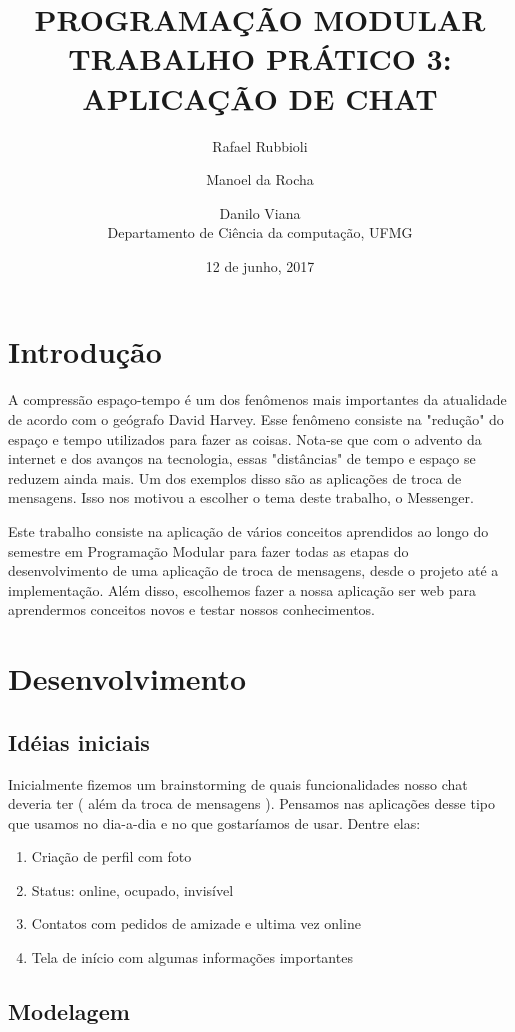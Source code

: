 \documentclass[12pt]{article}
\title{\LARGE \textbf{\uppercase{Programação modular\\Trabalho prático 3: Aplicação de Chat}} }
\date{12 de junho, 2017}
\author{Rafael Rubbioli\\
\and Manoel da Rocha\\
\and Danilo Viana\\ Departamento de Ciência da computação, UFMG}
\begin{document}
	\begin{titlepage}
		\maketitle
	\end{titlepage}
	\section{Introdução}
		
		A compressão espaço-tempo é um dos fenômenos mais importantes da atualidade de acordo com o geógrafo David Harvey. Esse fenômeno consiste na "redução" do espaço e tempo utilizados para fazer as coisas. Nota-se que com o advento da internet e dos avanços na tecnologia, essas "distâncias" de tempo e espaço se reduzem ainda mais. Um dos exemplos disso são as aplicações de troca de mensagens. Isso nos motivou a escolher o tema deste trabalho, o Messenger.

		Este trabalho consiste na aplicação de vários conceitos aprendidos ao longo do semestre em Programação Modular para fazer todas as etapas do desenvolvimento de uma aplicação de troca de mensagens, desde o projeto até a implementação. Além disso, escolhemos fazer a nossa aplicação ser web para aprendermos conceitos novos e testar nossos conhecimentos.

	\section{Desenvolvimento}

		\subsection{Idéias iniciais}
		Inicialmente fizemos um brainstorming de quais funcionalidades nosso chat deveria ter ( além da troca de mensagens ). Pensamos nas aplicações desse tipo que usamos no dia-a-dia e no que gostaríamos de usar. Dentre elas:
		\begin{enumerate}
			\item Criação de perfil com foto
			\item Status: online, ocupado, invisível
			\item Contatos com pedidos de amizade e ultima vez online
			\item Tela de início com algumas informações importantes 
		\end{enumerate}

		\subsection{Modelagem}
\end{document}
